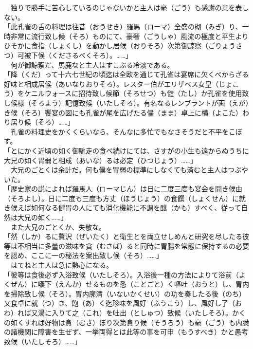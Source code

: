 　独りで勝手に苦心しているのじゃないかと主人は毫（ごう）も感謝の意を表しない。\\

「此孔雀の舌の料理は往昔（おうせき）羅馬（ローマ）全盛の砌（みぎ）り、一時非常に流行致し候（そろ）ものにて、豪奢（ごうしゃ）風流の極度と平生よりひそかに食指（しょくし）を動かし居候（おりそろ）次第御諒察（ごりょうさつ）可被下候（くださるべくそろ）。\ldots{}\ldots{}」\\

　何が御諒察だ、馬鹿なと主人はすこぶる冷淡である。\\

「降（くだ）って十六七世紀の頃迄は全欧を通じて孔雀は宴席に欠くべからざる好味と相成居候（あいなりおりそろ）。レスター伯がエリザベス女皇（じょこう）をケニルウォースに招待致し候節（そろせつ）も慥（たし）か孔雀を使用致し候様（そろよう）記憶致候（いたしそろ）。有名なるレンブラントが画（えが）き候（そろ）饗宴の図にも孔雀が尾を広げたる儘（まま）卓上に横（よこた）わり居り候（そろ）\ldots{}\ldots{}」\\

　孔雀の料理史をかくくらいなら、そんなに多忙でもなさそうだと不平をこぼす。\\

「とにかく近頃の如く御馳走の食べ続けにては、さすがの小生も遠からぬうちに大兄の如く胃弱と相成（あいな）るは必定（ひつじょう）\ldots{}\ldots{}」\\

　大兄のごとくは余計だ。何も僕を胃弱の標準にしなくても済むと主人はつぶやいた。\\

「歴史家の説によれば羅馬人（ローマじん）は日に二度三度も宴会を開き候由（そろよし）。日に二度も三度も方丈（ほうじょう）の食饌（しょくせん）に就き候えば如何なる健胃の人にても消化機能に不調を醸（かも）すべく、従って自然は大兄の如く\ldots{}\ldots{}」\\

　また大兄のごとくか、失敬な。\\

「然（しか）るに贅沢（ぜいたく）と衛生とを両立せしめんと研究を尽したる彼等は不相当に多量の滋味を貪（むさぼ）ると同時に胃腸を常態に保持するの必要を認め、ここに一の秘法を案出致し候（そろ）\ldots{}\ldots{}」\\

　はてねと主人は急に熱心になる。\\

「彼等は食後必ず入浴致候（いたしそろ）。入浴後一種の方法によりて浴前（よくぜん）に嚥下（えんか）せるものを悉（ことごと）く嘔吐（おうと）し、胃内を掃除致し候（そろ）。胃内廓清（いないかくせい）の功を奏したる後（のち）又食卓に就（つ）き、飽（あ）く迄珍味を風好（ふうこう）し、風好し了（おわ）れば又湯に入りて之（これ）を吐出（としゅつ）致候（いたしそろ）。かくの如くすれば好物は貪（むさ）ぼり次第貪り候（そうろう）も毫（ごう）も内臓の諸機関に障害を生ぜず、一挙両得とは此等の事を可申（もうすべき）かと愚考致候（いたしそろ）\ldots{}\ldots{}」\\

